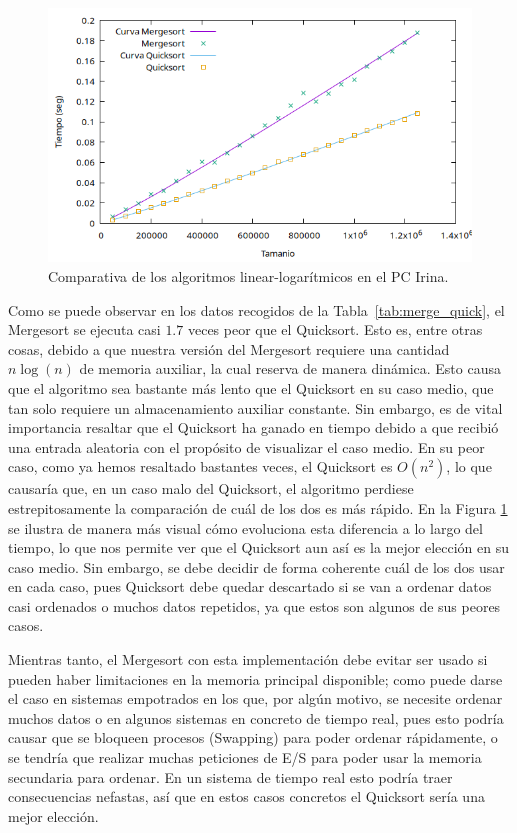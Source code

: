 \documentclass[12pt]{article}
\begin{document}
    \begin{figure}
        \centering
        \includegraphics[width=\linewidth]{images/Comparaciones/merge_quick.png}
        \caption{Comparativa de los algoritmos linear-logarítmicos en el PC Irina.}
        \label{fig:merge_quick}
    \end{figure}

    Como se puede observar en los datos recogidos de la Tabla~\ref{tab:merge_quick}, el Mergesort se ejecuta casi $1.7$ veces peor que el Quicksort. Esto es, entre otras cosas, debido a que nuestra versión del Mergesort requiere una cantidad $n \log(n)$ de memoria auxiliar, la cual reserva de manera dinámica. Esto causa que el algoritmo sea bastante más lento que el Quicksort en su caso medio, que tan solo requiere un almacenamiento auxiliar constante. Sin embargo, es de vital importancia resaltar que el Quicksort ha ganado en tiempo debido a que recibió una entrada aleatoria con el propósito de visualizar el caso medio. En su peor caso, como ya hemos resaltado bastantes veces, el Quicksort  es $O(n^2)$, lo que causaría que, en un caso malo del Quicksort, el algoritmo perdiese estrepitosamente la comparación de cuál de los dos es más rápido. 
    En la Figura \ref{fig:merge_quick} se ilustra de manera más visual cómo evoluciona esta diferencia a lo largo del tiempo, lo que nos permite ver que el Quicksort aun así es la mejor elección en su caso medio. Sin embargo, se debe decidir de forma coherente cuál de los dos usar en cada caso, pues Quicksort debe quedar descartado si se van a ordenar datos casi ordenados o muchos datos repetidos, ya que estos son algunos de sus peores casos. 
    
    Mientras tanto, el Mergesort con esta implementación debe evitar ser usado si pueden haber limitaciones en la memoria principal disponible; como puede darse el caso en sistemas empotrados en los que, por algún motivo, se necesite ordenar muchos datos o en algunos sistemas en concreto de tiempo real, pues esto podría causar que se bloqueen procesos (Swapping) para poder ordenar rápidamente, o se tendría que realizar muchas peticiones de E/S para poder usar la memoria secundaria para ordenar. En un sistema de tiempo real esto podría traer consecuencias nefastas, así que en estos casos concretos el Quicksort sería una mejor elección. 
    
\end{document}
